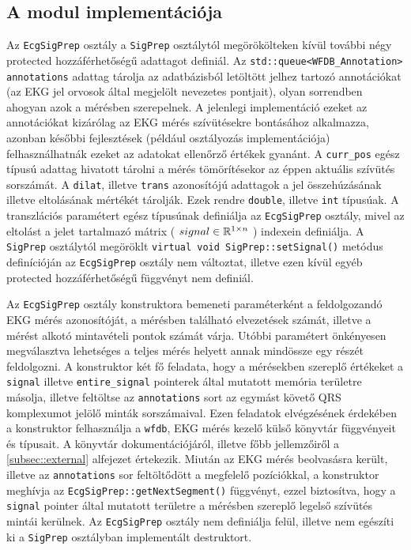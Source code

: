 \documentclass[oneside,titlepage,12pt,a4paper]{report}
\begin{document}
\subsection*{A modul implementációja}

\par Az \texttt{EcgSigPrep} osztály a \texttt{SigPrep} osztálytól megörökölteken kívül további négy protected hozzáférhetőségű adattagot definiál. Az \texttt{std::queue<WFDB\_Annotation> annotations} adattag tárolja az adatbázisból letöltött jelhez tartozó annotációkat (az EKG jel orvosok által megjelölt nevezetes pontjait), olyan sorrendben ahogyan azok a mérésben szerepelnek. A jelenlegi implementáció ezeket az annotációkat kizárólag az EKG mérés szívütésekre bontásához alkalmazza, azonban későbbi fejlesztések (például osztályozás implementációja) felhasználhatnák ezeket az adatokat ellenőrző értékek gyanánt. A \texttt{curr\_pos} egész típusú adattag hivatott tárolni a mérés tömörítésekor az éppen aktuális szívütés sorszámát. A \texttt{dilat}, illetve \texttt{trans} azonosítójú adattagok a jel összehúzásának illetve eltolásának mértékét tárolják. Ezek rendre \texttt{double}, illetve \texttt{int} típusúak. A transzlációs paramétert egész típusúnak definiálja az \texttt{EcgSigPrep} osztály, mivel az eltolást a jelet tartalmazó mátrix ( $ signal \in \Bbb R^{1 \times n} $ ) indexein definiálja. A \texttt{SigPrep} osztálytól megöröklt \texttt{virtual void SigPrep::setSignal()} metódus definícióján az \texttt{EcgSigPrep} osztály nem változtat, illetve ezen kívül egyéb protected hozzáférhetőségű függvényt nem definiál.
\par Az \texttt{EcgSigPrep} osztály konstruktora bemeneti paraméterként a feldolgozandó EKG mérés azonosítóját, a mérésben található elvezetések számát, illetve a mérést alkotó mintavételi pontok számát várja. Utóbbi paramétert önkényesen megválasztva lehetséges a teljes mérés helyett annak mindössze egy részét feldolgozni. A konstruktor két fő feladata, hogy a mérésekben szereplő értékeket a \texttt{signal} illetve \texttt{entire\_signal} pointerek által mutatott memória területre másolja, illetve feltöltse az \texttt{annotations} sort az egymást követő QRS komplexumot jelölő minták sorszámaival. Ezen feladatok elvégzésének érdekében a konstruktor felhasználja a \texttt{wfdb}, EKG mérés kezelő külső könyvtár függvényeit és típusait. A könyvtár dokumentációjáról, illetve főbb jellemzőiről a \ref{subsec::external} alfejezet értekezik. Miután az EKG mérés beolvasásra került, illetve az \texttt{annotations} sor feltöltődött a megfelelő pozíciókkal, a konstruktor meghívja az \texttt{EcgSigPrep::getNextSegment()} függvényt, ezzel biztosítva, hogy a \texttt{signal} pointer által mutatott területre a mérésben szereplő legelső szívütés mintái kerülnek. Az \texttt{EcgSigPrep} osztály nem definiálja felül, illetve nem egészíti ki a \texttt{SigPrep} osztályban implementált destruktort. 
\end{document}
